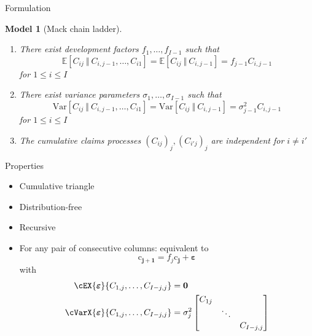 \documentclass[tikz]{beamer}
\newtheorem{model}{Model}
\begin{document}
\begin{frame}{Formulation}
    \small
    \begin{model}[Mack chain ladder]
        \begin{enumerate}
            \item There exist development factors $f_1, \dots, f_{I - 1}$ such that
                  \begin{equation*}
                      \mathbb{E}[C_{ij} \ \Vert \ C_{i, j - 1}, \dots, C_{i1}] = \mathbb{E}[C_{ij} \ \Vert \ C_{i, j - 1}] = f_{j - 1} C_{i, j - 1}
                  \end{equation*}
                  for $1 \leq i \leq I$
            \item There exist variance parameters $\sigma_1, \dots, \sigma_{I - 1}$ such that
                  \begin{equation*}
                      \mathrm{Var}[C_{ij} \ \Vert \ C_{i, j - 1}, \dots, C_{i1}] = \mathrm{Var}[C_{ij} \ \Vert \ C_{i, j - 1}] = \sigma_{j - 1}^2 C_{i, j - 1}
                  \end{equation*}
                  for $1 \leq i \leq I$
            \item The cumulative claims processes $(C_{ij})_j, (C_{i'j})_j$ are independent for $i \neq i'$
        \end{enumerate}
    \end{model}
\end{frame}

\begin{frame}{Properties}
    \begin{itemize}
        \item Cumulative triangle
        \item Distribution-free
        \item Recursive
        \item For any pair of consecutive columns: equivalent to
              \begin{equation*}
                  \bm{\mathrm{c}_{j + 1}} = f_j \bm{\mathrm{c}_j} + \bm{\varepsilon}
              \end{equation*}
              with
              \begin{align*}
                  \cEX{\bm{\varepsilon}}{C_{1, j}, \dots, C_{I - j, j}}   & = \bm{0}     \\
                  \cVarX{\bm{\varepsilon}}{C_{1, j}, \dots, C_{I - j, j}} & = \sigma^2_j
                  \begin{bmatrix}
                      C_{1j} &        &              \\
                             & \ddots &              \\
                             &        & C_{I - j, j}
                  \end{bmatrix}
              \end{align*}
    \end{itemize}
\end{frame}
\end{document}
